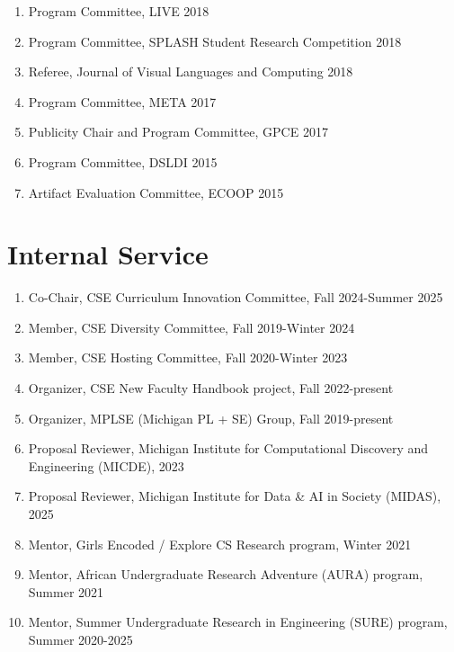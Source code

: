 \documentclass[10pt,letterpaper]{article}
\begin{document}
\begin{enumerate}
  \item Program Committee, LIVE 2018
  \item Program Committee, SPLASH Student Research Competition 2018
  \item Referee, Journal of Visual Languages and Computing 2018
  \item Program Committee, META 2017
  \item Publicity Chair and Program Committee, GPCE 2017
  \item Program Committee, DSLDI 2015
  \item Artifact Evaluation Committee, ECOOP 2015
\end{enumerate}

\section*{Internal Service}
\begin{enumerate}
  \item Co-Chair, CSE Curriculum Innovation Committee, Fall 2024-Summer 2025
    
  \item Member, CSE Diversity Committee, Fall 2019-Winter 2024
  \item Member, CSE Hosting Committee, Fall 2020-Winter 2023
  \item Organizer, CSE New Faculty Handbook project, Fall 2022-present
  \item Organizer, MPLSE (Michigan PL + SE) Group, Fall 2019-present
  \item Proposal Reviewer, Michigan Institute for Computational Discovery and Engineering (MICDE), 2023
  \item Proposal Reviewer, Michigan Institute for Data \& AI in Society (MIDAS), 2025
  \item Mentor, Girls Encoded / Explore CS Research program, Winter 2021
  \item Mentor, African Undergraduate Research Adventure (AURA) program, Summer 2021
  \item Mentor, Summer Undergraduate Research in Engineering (SURE) program, Summer 2020-2025
\end{enumerate}
\end{document}
